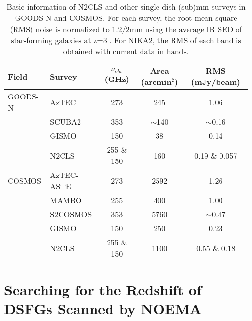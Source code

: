 \documentclass{webofc}
\begin{document}
\begin{table*}
\caption{Basic information of N2CLS and other single-dish (sub)mm surveys in GOODS-N and COSMOS. For each survey, the root mean square (RMS) noise is normalized to 1.2/2mm using the average IR SED of star-forming galaxies at z=3 \cite{B15}. For NIKA2, the RMS of each band is obtained with current data in hands.}
\label{tab-1}       %
\begin{tabular}{llccc}
\hline
Field & Survey & $\nu_{obs}$ (GHz) & Area (arcmin$^2$) & RMS (mJy/beam)\\
\hline 
GOODS-N & AzTEC & 273 & 245 & 1.06 \\
& SCUBA2 & 353 & $\sim$140 & $\sim$0.16 \\
& GISMO & 150 & 38 & 0.14 \\
& N2CLS & 255 \& 150 & 160 & 0.19 \& 0.057  \\
\hline
COSMOS & AzTEC-ASTE & 273 & 2592 & 1.26 \\
& MAMBO & 255 & 400 & 1.00 \\
& S2COSMOS & 353 & 5760 & $\sim$0.47  \\
& GISMO & 150 & 250 & 0.23 \\
& N2CLS & 255 \& 150 & 1100 & 0.55 \& 0.18 \\\hline%
\end{tabular}
\end{table*}


\section{Searching for the Redshift of DSFGs Scanned by NOEMA}
\label{sec-2}
\end{document}
